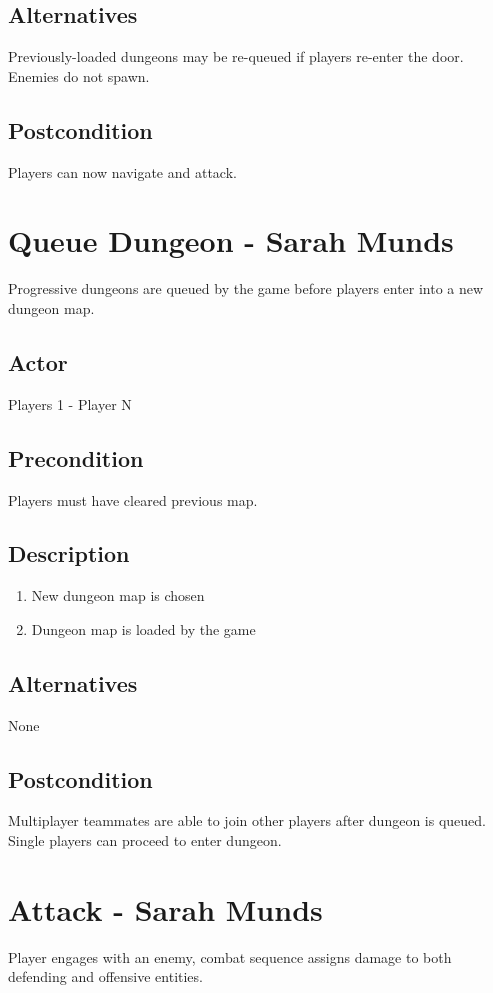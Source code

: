\documentclass[11pt]{article}
\begin{document}
		\subsection{Alternatives}
			Previously-loaded dungeons may be re-queued if players re-enter the door. Enemies do not spawn. 
		\subsection{Postcondition}
			Players can now navigate and attack. 

    \section{Queue Dungeon - Sarah Munds}
	Progressive dungeons are queued by the game before players enter into a new dungeon map. 

		\subsection{Actor}
		Players 1 - Player N

		\subsection{Precondition}
 		Players must have cleared previous map.

		\subsection{Description}
			\begin{enumerate}
			\item New dungeon map is chosen
			\item Dungeon map is loaded by the game
			\end{enumerate}

		\subsection{Alternatives}
			None 
		\subsection{Postcondition}
			Multiplayer teammates are able to join other players after dungeon is queued. 
			Single players can proceed to enter dungeon. 


    \section{Attack - Sarah Munds}
	Player engages with an enemy, combat sequence assigns damage to both defending and offensive entities. 
\end{document}
